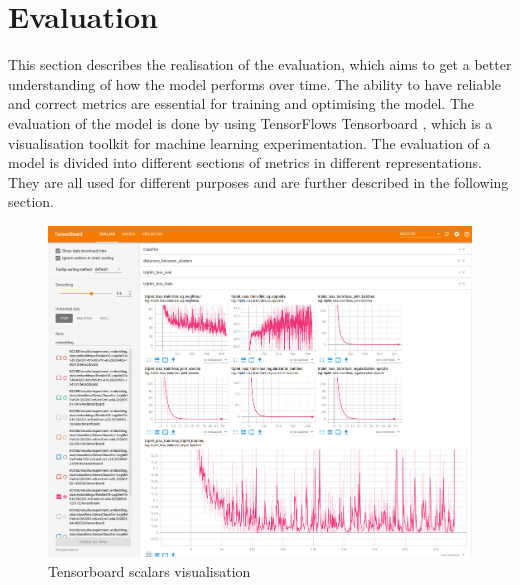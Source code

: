 \section{Evaluation}
\label{sec:Realisation-Evaluation}
This section describes the realisation of the evaluation, which aims to get a better understanding of how the model performs over time. The ability to have reliable and correct metrics are essential for training and optimising the model. The evaluation of the model is done by using TensorFlows Tensorboard \footnotemark, which is a visualisation toolkit for machine learning experimentation. The evaluation of a model is divided into different sections of metrics in different representations. They are all used for different purposes and are further described in the following section.

\begin{figure}[htbp]
	\centering
	\includegraphics[width=0.85\linewidth]{img/Tensorboard_Scalars.png}
	\caption{Tensorboard scalars visualisation}
	\label{fig:Tensorboard-Scalars}
\end{figure}

